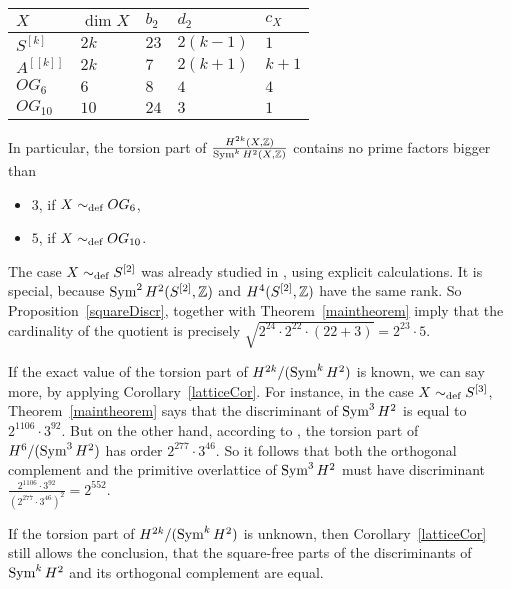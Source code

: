 \begin{center}
\begin{tabular}{ p{2cm} p{2cm} p{2cm} p{2cm} p{2cm} }
$X$ 		& $\dim X$	& $b_2$ & $d_2$	& $c_X$ \\ \hline 
$S^{[k]}$ 	& $2k$ 		& $23$ 	& $ 2(k-1)$		& $1$	\\
$A^{[[k]]}$	& $2k$ 		& $7$	& $ 2(k+1)$		& $k+1$ \\
$OG_6$		& $6$		& $8$	& $4$			& $4$ 	\\
$OG_{10}$	& $10$		& $24$	& $3$			& $1$ 	
\end{tabular}
\end{center}
In particular, the torsion part of $\frac{H^{2k}(X,\mathbb{Z})}{\operatorname{Sym}^kH^2(X,\mathbb{Z})}$ contains no prime factors bigger than
\begin{itemize}
\item $3$, if $X\sim_{\text{def}} OG_6$,
\item $5$, if $X\sim_{\text{def}} OG_{10}$.
\end{itemize} 
\begin{remark}
The case $X\sim_{\text{def}} S^{[2]}$ was already studied in \cite[Prop.~6.6]{BNS}, using explicit calculations. It is special, because $\operatorname{Sym}^2H^2(S^{[2]},\mathbb{Z})$ and $H^4(S^{[2]},\mathbb{Z})$ have the same rank. So Proposition~\ref{squareDiscr}, together with Theorem~\ref{maintheorem} imply that the cardinality of the quotient is precisely $\sqrt{2^{24}\cdot2^{22}\cdot(22+3)} = 2^{23}\cdot5$.
\end{remark}
\begin{remark}
If the exact value of the torsion part of $H^{2k}/(\operatorname{Sym}^kH^2)$ is known, we can say more, by applying Corollary~\ref{latticeCor}. For instance,
in the case $X\sim_{\text{def}} S^{[3]}$, Theorem~\ref{maintheorem} says that the discriminant of $\operatorname{Sym}^3H^2$ is equal to $2^{1106}\cdot 3^{92}$. But on the other hand, according to \cite[Prop.~2.4]{Kapfer}, the torsion part of $H^6/(\operatorname{Sym}^3H^2)$ has order $2^{277}\cdot 3^{46}$. So it follows that both the orthogonal complement and the primitive overlattice of $\operatorname{Sym}^3H^2$ must have discriminant $\frac{2^{1106}\cdot 3^{92}}{(2^{277}\cdot 3^{46})^2}=2^{552}$.

If the torsion part of $H^{2k}/(\operatorname{Sym}^kH^2)$ is unknown, then Corollary~\ref{latticeCor} still allows the conclusion, that the square-free parts of the discriminants of $\operatorname{Sym}^kH^2$ and its orthogonal complement are equal.
\end{remark}

